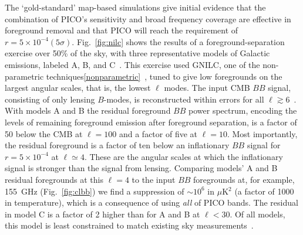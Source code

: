 \documentclass[PICOReport.tex]{subfiles}
\begin{document}

The `gold-standard' map-based simulations give initial evidence that the combination of PICO's sensitivity and broad frequency coverage are effective in foreground removal and that PICO will reach the requirement of $r = 5\times 10^{-4} (5\sigma)$. Fig.~\ref{fig:nilc} shows the results of a foreground-separation exercise over 50\% of the sky, with three representative models of Galactic emissions, labeled A, B, and C~\citep{gnilc_memo}.  This exercise used GNILC, one of the non-parametric techniques\cref{nonparametric}~\citep{gnilc}, tuned to give low foregrounds on the largest angular scales, that is, the lowest $\ell$ modes. The input CMB $BB$ signal, consisting of only lensing $B$-modes, is reconstructed within errors for all $\ell \gtrsim 6$~\citep{gnilc_memo}.  With models A and B the residual foreground $BB$ power spectrum, encoding the levels of remaining foreground emission after foreground separation, is a factor of 50 below the CMB at $\ell=100$ and a factor of five at $\ell=10$. Most importantly, the residual foreground is a factor of ten below an inflationary $BB$ signal for  $r = 5\times 10^{-4}$ at $\ell \simeq 4$.  These are the angular scales at which the inflationary signal is stronger than the signal from lensing. 
Comparing models' A and B residual foregrounds at this $\ell =4 $ to the input $BB$ foregrounds at, for example, 155~GHz (Fig.~\ref{fig:clbb}) we find a suppression of $\sim10^{6}$ in $\mu$K$^{2}$ (a factor of 1000 in temperature), which is a consequence of using {\it all} of PICO bands. 
The residual in model C is a factor of 2 higher than for A and B at $\ell <30$. Of all models, this model is least constrained to match existing sky measurements~\citep{gnilc_memo}.  
\end{document}
